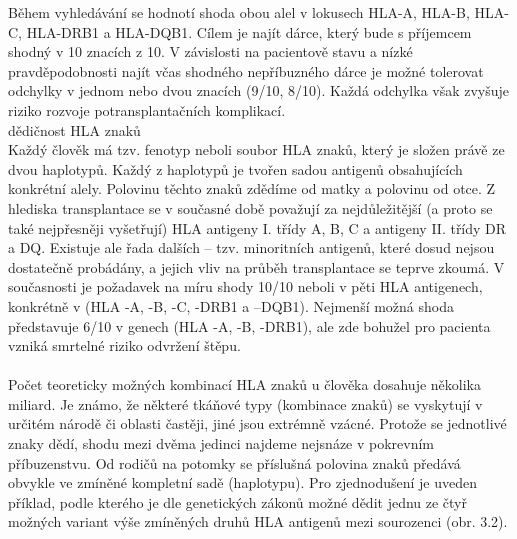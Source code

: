 \documentclass[czech,DP]{thesiskiv}
\begin{document}
Během vyhledávání se hodnotí shoda obou alel v lokusech HLA-A, HLA-B, HLA-C,
HLA-DRB1 a HLA-DQB1. Cílem je najít dárce, který bude s příjemcem shodný v 10 znacích
z 10. V závislosti na pacientově stavu a nízké pravděpodobnosti najít včas shodného
nepříbuzného dárce je možné tolerovat odchylky v jednom nebo dvou znacích (9/10,
8/10). Každá odchylka však zvyšuje riziko rozvoje potransplantačních komplikací.
\\
dědičnost HLA znaků
\\
Každý člověk má tzv. fenotyp neboli soubor HLA znaků, který je složen právě
ze dvou haplotypů. Každý z haplotypů je tvořen sadou antigenů obsahujících konkrétní
alely. Polovinu těchto znaků zdědíme od matky a polovinu od otce.
Z hlediska transplantace se v současné době považují za nejdůležitější (a proto
se také nejpřesněji vyšetřují) HLA antigeny I. třídy A, B, C a antigeny II. třídy DR a
DQ. Existuje ale řada dalších – tzv. minoritních antigenů, které dosud nejsou
dostatečně probádány, a jejich vliv na průběh transplantace se teprve zkoumá.
V současnosti je požadavek na míru shody 10/10 neboli v pěti HLA antigenech,
konkrétně v (HLA -A, -B, -C, -DRB1 a –DQB1). Nejmenší možná shoda představuje
6/10 v genech (HLA -A, -B, -DRB1), ale zde bohužel pro pacienta vzniká smrtelné
riziko odvržení štěpu.
\\
\\
Počet teoreticky možných kombinací HLA znaků u člověka dosahuje několika
miliard. Je známo, že některé tkáňové typy (kombinace znaků) se vyskytují v určitém
národě či oblasti častěji, jiné jsou extrémně vzácné. Protože se jednotlivé znaky dědí,
shodu mezi dvěma jedinci najdeme nejsnáze v pokrevním příbuzenstvu. Od rodičů na
potomky se příslušná polovina znaků předává obvykle ve zmíněné kompletní sadě
(haplotypu).
Pro zjednodušení je uveden příklad, podle kterého je dle genetických zákonů
možné dědit jednu ze čtyř možných variant výše zmíněných druhů HLA antigenů mezi
sourozenci (obr. 3.2).
\end{document}
